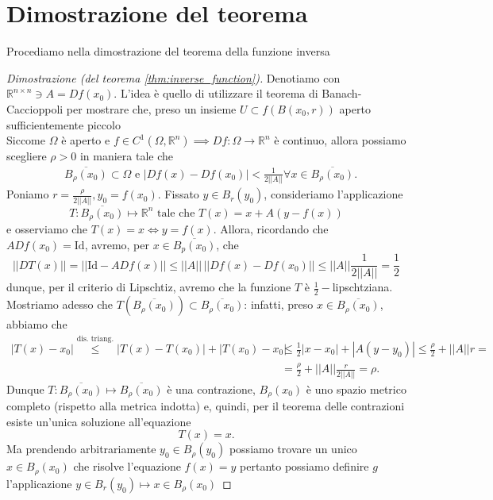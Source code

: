 \section{Dimostrazione del teorema}
Procediamo nella dimostrazione del teorema della funzione inversa
\begin{proof}[Dimostrazione (del teorema \ref{thm:inverse_function})]
	Denotiamo con $\mathbb{R}^{n \times n} \ni A = Df(x_0)$. L'idea è quello di utilizzare il teorema di Banach-Caccioppoli per mostrare che, preso un insieme $U \subset f(B(x_0, r))$ aperto sufficientemente piccolo\\
	Siccome $\Omega$ è aperto e $f \in C^1(\Omega, \mathbb{R}^n) \implies Df: \Omega \to \mathbb{R}^n$ è continuo, allora possiamo scegliere $\rho > 0$ in maniera tale che
	\begin{align*}
	&\overline{B_{\rho}(x_0)} \subset \Omega \text{    e    } |Df(x) - Df(x_0)| < \frac{1}{2 || A ||} \forall x \in \overline{B_\rho(x_0)}.
	\end{align*}
	Poniamo $r = \frac{\rho}{2 || A ||}, y_0 = f(x_0)$. Fissato $y \in B_r(y_0)$, consideriamo l'applicazione
	$$
	T : \overline{B_{\rho}(x_0)} \mapsto \mathbb{R}^n \text{ tale che } 	T(x) = x + A(y-f(x))
	$$
	e osserviamo che $T(x) = x \iff y=f(x)$. Allora, ricordando che $ADf(x_0) = \text{Id}$, avremo, per $x \in \overline{B_p(x_0)}$, che
	$$
	|| DT(x) || = || \text{Id} - ADf(x) ||  \leq || A || \, || Df(x) - Df(x_0) || \leq || A || \frac{1}{2 || A ||} = \frac{1}{2}
	$$
	dunque, per il criterio di Lipschtiz, avremo che la funzione $T$ è $\frac{1}{2}-$lipschtziana. Mostriamo adesso che $T(\overline{B_\rho(x_0)}) \subset \overline{B_\rho(x_0)}$: infatti, preso $x \in \overline{B_\rho(x_0)}$, abbiamo che
	\begin{align*}
	|T(x) - x_0| \stackrel{\text{dis. triang.}}{\leq} |T(x) - T(x_0)| + |T(x_0) - x_0| &\leq \frac{1}{2} |x-x_0| + |A(y - y_0)| \leq \frac{\rho}{2} + || A || r = \\
	&=\frac{\rho}{2} + || A || \frac{r}{2 || A ||} = \rho.
	\end{align*}
	Dunque $T : \overline{B_\rho(x_0)} \mapsto \overline{B_\rho(x_0)}$ è una contrazione, $B_\rho(x_0)$ è uno spazio metrico completo (rispetto alla metrica indotta) e, quindi, per il teorema delle contrazioni esiste un'unica soluzione all'equazione
	$$
		T(x) = x.
	$$
	Ma prendendo arbitrariamente $y_0 \in B_\rho(y_0)$ possiamo trovare un unico $x \in B_\rho(x_0)$ che risolve l'equazione $f(x) = y$
	pertanto possiamo definire $g$ l'applicazione $y \in B_{r}(y_0) \mapsto x \in B_{\rho}(x_0)$

\end{proof}
